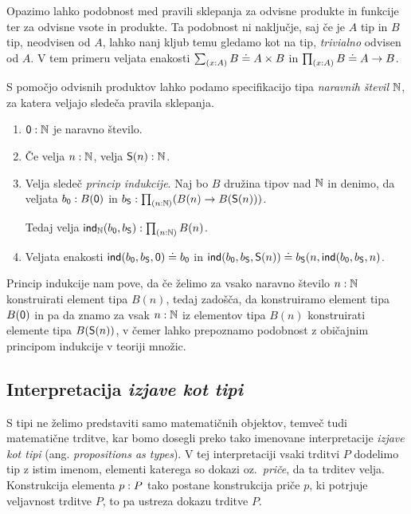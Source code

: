 \begin{opomba}
  \label{neodvisna-vsota}
Opazimo lahko podobnost med pravili sklepanja za odvisne produkte in
funkcije ter za odvisne vsote in produkte. Ta podobnost ni naključje, saj če
je \(A\) tip in \(B\) tip, neodvisen od \(A\), lahko nanj kljub temu gledamo kot na tip,
\emph{trivialno} odvisen od \(A\). V tem primeru veljata enakosti
\(\textstyle \sum_{\left( x : A \right)} B \doteq A \times B\) in \(\textstyle \prod_{\left( x : A \right)} B \doteq A \to B\).
\end{opomba}

\begin{primer}
  S pomočjo odvisnih produktov lahko podamo specifikacijo tipa
  \emph{naravnih števil} \(\mathbb N\), za katera veljajo sledeča pravila sklepanja.
  \begin{enumerate}
  \item \(\textnormal{\textsf{0}} : \mathbb N\) je naravno število.
  \item Če velja \(n : \mathbb N\),
    velja \(\textnormal{\textsf{S}}(n) : \mathbb N\).
  \item Velja sledeč \emph{princip indukcije}. Naj bo \(B\) družina tipov nad \(\mathbb N\) in
    denimo, da veljata \(b_{\textnormal{\textsf{0}}} : B(\textnormal{\textsf{0}})\) in
    \(b_{\textnormal{\textsf{S}}} : \textstyle \prod_{\left( n : \mathbb N \right)} (B(n) \to B(\textnormal{\textsf{S}}(n)))\).

    Tedaj velja
    \(\textnormal{\textsf{ind}}_{\mathbb N}(b_{\textnormal{\textsf{0}}}, b_{\textnormal{\textsf{S}}}) : \textstyle \prod_{\left( n : \mathbb N \right)} B(n)\).
  \item Veljata enakosti
    \label{naturals}
    \(\textnormal{\textsf{ind}}(b_{\textnormal{\textsf{0}}}, b_{\textnormal{\textsf{S}}}, \textnormal{\textsf{0}}) \doteq b_{\textnormal{\textsf{0}}}\) in
    \(\textnormal{\textsf{ind}}(b_{\textnormal{\textsf{0}}}, b_{\textnormal{\textsf{S}}}, \textnormal{\textsf{S}}(n)) \doteq
      b_{\textnormal{\textsf{S}}}(n, \textnormal{\textsf{ind}}(b_{\textnormal{\textsf{0}}}, b_{\textnormal{\textsf{S}}}, n)\).
  \end{enumerate}
  Princip indukcije nam pove, da če želimo za vsako naravno število \(n : \mathbb N\)
  konstruirati element tipa \(B(n)\), tedaj zadošča, da konstruiramo element tipa \(B(\textnormal{\textsf{0}})\)
  in pa da znamo za vsak \(n : \mathbb N\) iz elementov tipa \(B(n)\) konstruirati elemente
  tipa \(B(\textnormal{\textsf{S}}(n))\), v čemer lahko prepoznamo podobnost z običajnim principom indukcije v
  teoriji množic.
\end{primer}

\subsection{Interpretacija \emph{izjave kot tipi}}

S tipi ne želimo predstaviti samo matematičnih objektov, temveč tudi matematične trditve,
kar bomo dosegli preko tako imenovane interpretacije \emph{izjave kot tipi}
(ang. \emph{propositions as types}). V tej interpretaciji vsaki trditvi \(P\) dodelimo
tip z istim imenom, elementi katerega so dokazi oz.~\emph{priče}, da ta trditev velja.
Konstrukcija
elementa \(p : P\) tako postane konstrukcija priče \(p\), ki potrjuje
veljavnost trditve \(P\), to pa ustreza dokazu trditve \(P\).

